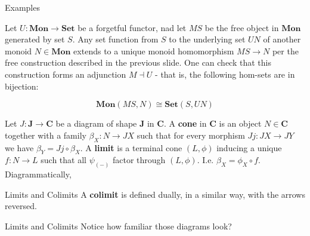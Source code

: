 \documentclass[tikz]{beamer}
\theoremstyle{definition}
\newcommand{\cat}[1]{\mathbf{#1}}
\begin{document}
\begin{frame}{Examples}

Let $U: \cat{Mon} \to \cat{Set}$ be a forgetful functor, nad let $MS$ be the free object in $\cat{Mon}$ generated by set $S$. Any set function from $S$ to the underlying set $UN$ of another monoid $N \in \cat{Mon}$ extends to a unique monoid homomorphism $MS \to N$ per the free construction described in the previous slide. One can check that this construction forms an adjunction $ M \dashv U$ - that is, the following hom-sets are in bijection:

\begin{center}
    \begin{equation*}
        \cat{Mon}(MS, N) \cong \cat{Set}(S, UN)
    \end{equation*}{}
\end{center}

\end{frame}

\begin{frame}[fragile]

Let $J: \cat{J} \to \cat{C}$ be a diagram of shape $\cat{J}$ in $\cat{C}$. A \textbf{cone} in $\cat{C}$ is an object $N \in \cat{C}$ together with a family $\beta_X: N \to JX$ such that for every morphism $Jj: JX \to JY$ we have $\beta_Y = Jj \circ \beta_X$. A \textbf{limit} is a terminal cone $(L, \phi)$ inducing a unique $f: N \to L$ such that all $\psi_{(-)}$ factor through $(L, \phi)$. I.e. $\beta_X = \phi_X \circ f$. Diagrammatically, 

\begin{center}
\end{center}
    
\end{frame}

\begin{frame}{Limits and Colimits}
A \textbf{colimit} is defined dually, in a  similar way, with the arrows reversed. 
\end{frame}

\begin{frame}{Limits and Colimits}
Notice how familiar those diagrams look?
\end{frame}
\end{document}
